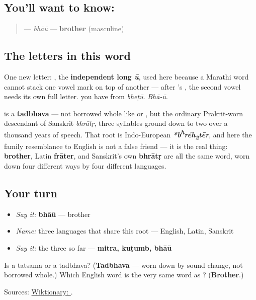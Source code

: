 \subsection*{You'll want to know: }
\begin{quote}
\textbf{} — \emph{bhāū} — \textbf{brother} (masculine)
\end{quote}

\subsection*{The letters in this word}
One new letter: \textbf{}, the \textbf{independent long \emph{ū}}, used here because a Marathi word cannot stack one vowel mark on top of another — after \textbf{}'s \textbf{}, the second vowel needs its own full letter. \textbf{} you have from \emph{bheṭū}. \emph{Bhā-ū}.

\begin{cousinweb}
\textbf{} is a \textbf{tadbhava} — not borrowed whole like \textbf{} or \textbf{}, but the ordinary Prakrit-worn descendant of Sanskrit \textbf{} \emph{bhrātṛ}, three syllables ground down to two over a thousand years of speech. That root is Indo-European \emph{\textbf{*b\textsuperscript{h}réh\textsubscript{2}tēr}}, and here the family resemblance to English is not a false friend — it is the real thing: \textbf{brother}, Latin \textbf{frāter}, and Sanskrit's own \textbf{bhrātṛ} are all the same word, worn down four different ways by four different languages.
\end{cousinweb}

\subsection*{Your turn}
\begin{itemize}
\raggedright
  \item \emph{Say it:} \textbf{bhāū} — brother
  \item \emph{Name:} three languages that share this root — English, Latin, Sanskrit
  \item \emph{Say it:} the three so far — \textbf{mitra, kuṭumb, bhāū}
\end{itemize}

\begin{tcolorbox}[breakable,colback=teal!4,colframe=teal!35!black,title={Before you move on}]
Is \textbf{} a tatsama or a tadbhava? (\textbf{Tadbhava} — worn down by sound change, not borrowed whole.) Which English word is the very same word as \textbf{}? (\textbf{Brother}.)

Sources: \href{https://en.wiktionary.org/wiki/\%E0\%A4\%AD\%E0\%A4\%BE\%E0\%A4\%8A}{Wiktionary: }.
\end{tcolorbox}

